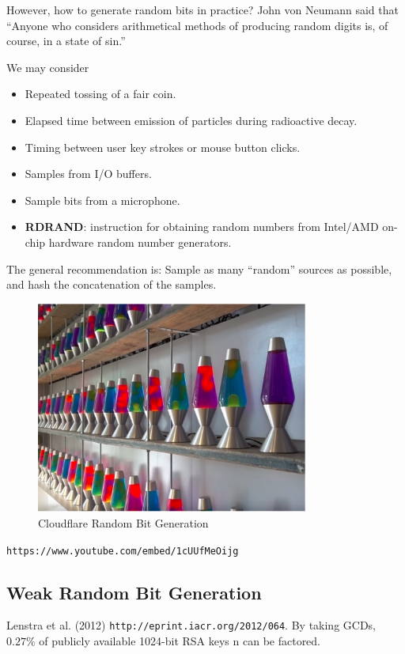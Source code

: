 \documentclass[12pt,titlepage]{article}
\begin{document}
However, how to generate random bits in practice? John von Neumann said that ``Anyone who considers arithmetical methods of producing random digits is, of course, in a state of sin.''

We may consider\begin{itemize}
	\item Repeated tossing of a fair coin.
	\item Elapsed time between emission of particles during radioactive decay.
	\item Timing between user key strokes or mouse button clicks.
	\item Samples from I/O buffers.
	\item Sample bits from a microphone.
	\item \textbf{RDRAND}: instruction for obtaining random numbers from Intel/AMD on-chip hardware random number generators.
\end{itemize}
The general recommendation is: Sample as many ``random'' sources as possible, and hash the concatenation of the samples.

\begin{center}
	\begin{figure}[h!]
		\centering
		\includegraphics[width=0.8\textwidth]{Cloudflare_Random_Bit_Generation.png}
		\caption{Cloudflare Random Bit Generation}
	\end{figure}
	\texttt{https://www.youtube.com/embed/1cUUfMeOijg}
\end{center}

\subsection{Weak Random Bit Generation}
Lenstra et al. (2012) \texttt{http://eprint.iacr.org/2012/064}. By taking GCDs, $0.27\%$ of publicly available 1024-bit RSA keys n can be factored.
\end{document}
